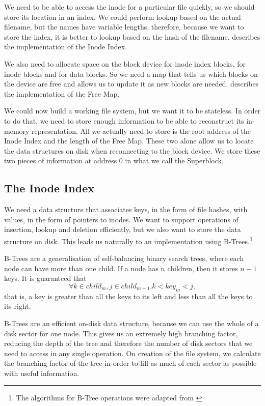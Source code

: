 \documentclass[12pt,a4paper,twoside,openright]{report}
\begin{document}
We need to be able to access the inode for a particular file quickly, so we should store its location in an index. We could perform lookup based on the actual filename, but the names have variable lengths, therefore, because we want to store the index, it is better to lookup based on the hash of the filename.  describes the implementation of the Inode Index.

We also need to allocate space on the block device for inode index blocks, for inode blocks and for data blocks. So we need a map that tells us which blocks on the device are free and allows us to update it as new blocks are needed.  describes the implementation of the Free Map.

We could now build a working file system, but we want it to be stateless. In order to do that, we need to store enough information to be able to reconstruct its in-memory representation. All we actually need to store is the root address of the Inode Index and the length of the Free Map. These two alone allow us to locate the data structures on disk when reconnecting to the block device. We store these two pieces of information at address 0 in what we call the Superblock.

\subsection{The Inode Index}
\label{subsec:inodeindex}

We need a data structure that associates keys, in the form of file hashes, with values, in the form of pointers to inodes. We want to support operations of insertion, lookup and deletion efficiently, but we also want to store the data structure on disk. This leads us naturally to an implementation using B-Trees.\footnote{The algorithms for B-Tree operations were adapted from \cite{CLRS09}}

B-Trees are a generalisation of self-balancing binary search trees, where each node can have more than one child. If a node has $n$ children, then it stores $n-1$ keys. It is guaranteed that $$ \forall k \in child_m, j \in child_{m+1} . k < key_m < j, $$ that is, a key is greater than all the keys to its left and less than all the keys to its right. 

B-Trees are an efficient on-disk data structure, because we can use the whole of a disk sector for one node. This gives us an extremely high branching factor, reducing the depth of the tree and therefore the number of disk sectors that we need to access in any single operation. On creation of the file system, we calculate the branching factor of the tree in order to fill as much of each sector as possible with useful information.
\end{document}
